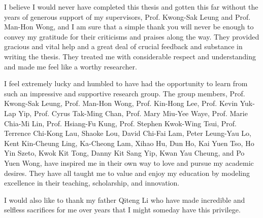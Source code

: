 I believe I would never have completed this thesis and gotten this far without the years of generous support of my supervisors, Prof. Kwong-Sak Leung and Prof. Man-Hon Wong, and I am sure that a simple thank you will never be enough to convey my gratitude for their criticisms and praises along the way. They provided gracious and vital help and a great deal of crucial feedback and substance in writing the thesis. They treated me with considerable respect and understanding and made me feel like a worthy researcher.

I feel extremely lucky and humbled to have had the opportunity to learn from such an impressive and supportive research group. The group members, Prof. Kwong-Sak Leung, Prof. Man-Hon Wong, Prof. Kin-Hong Lee, Prof. Kevin Yuk-Lap Yip, Prof. Cyrus Tak-Ming Chan, Prof. Mary Miu-Yee Waye, Prof. Marie Chia-Mi Lin, Prof. Hsiang-Fu Kung, Prof. Stephen Kwok-Wing Tsui, Prof. Terrence Chi-Kong Lau, Shaoke Lou, David Chi-Fai Lam, Peter Leung-Yau Lo, Kent Kin-Cheung Ling, Ka-Cheong Lam, Xihao Hu, Dun Ho, Kai Yuen Tso, Ho Yin Szeto, Kwok Kit Tong, Danny Kit Sang Yip, Kwan Yau Cheung, and Po Yuen Wong, have inspired me in their own way to love and pursue my academic desires. They have all taught me to value and enjoy my education by modeling excellence in their teaching, scholarship, and innovation.

I would also like to thank my father Qiteng Li who have made incredible and selfless sacrifices for me over years that I might someday have this privilege.

